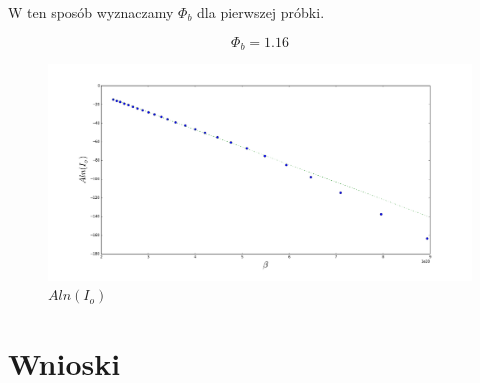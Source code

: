 \documentclass[a4paper,12pt]{article}
\begin{document}
W ten sposób wyznaczamy $\Phi_b$ dla pierwszej próbki.


$$\Phi_b = 1.16$$

\begin{figure} [H]
  \begin{center}
    \includegraphics[width = 15cm]{A_lnI.png}
    \caption{$A ln(I_o)$}
  \end{center}
\end{figure}


\section{Wnioski}
\end{document}
